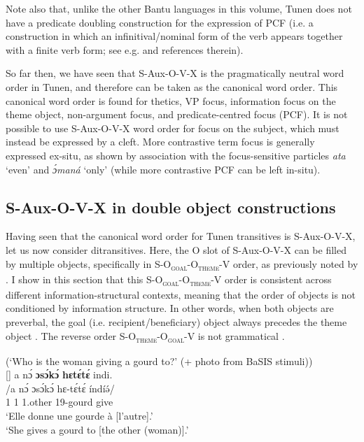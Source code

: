 \documentclass[output=paper,colorlinks,citecolor=brown
]{langscibook}
\begin{document}
\z
\z

Note also that, unlike the other Bantu languages in this volume, Tunen does not have a predicate doubling construction for the expression of PCF (i.e. a construction in which an infinitival/nominal form of the verb appears together with a finite verb form; see e.g. \citealt{GüldemannEtAl2015} and references therein).\largerpage

So far then, we have seen that S-Aux-O-V-X is the pragmatically neutral word order in Tunen, and therefore can be taken as the canonical word order. This canonical word order is found for thetics, VP focus, information focus on the theme object, non-argument focus, and predicate-centred focus (PCF). It is not possible to use S-Aux-O-V-X word order for focus on the subject, which must instead be expressed by a cleft. More contrastive term focus is generally expressed ex-situ, as shown by association with the focus-sensitive particles \textit{ata} `even' and \textit{ɔ́maná} `only' (while more contrastive PCF can be left in-situ).


\subsection{S-Aux-O-V-X in double object constructions}
Having seen that the canonical word order for Tunen transitives is S-Aux-O-V-X, let us now consider ditransitives. Here, the O slot of S-Aux-O-V-X can be filled by multiple objects, specifically in S-O\textsubscript{\textsc{goal}}-O\textsubscript{\textsc{theme}}-V order, as previously noted by \citet{Mous1997, Mous2003}. I show in this section that this S-O\textsubscript{\textsc{goal}}-O\textsubscript{\textsc{theme}}-V order is consistent across different information-structural contexts, meaning that the order of objects is not conditioned by information structure. In other words, when both objects are preverbal, the goal (i.e. recipient/beneficiary) object always precedes the theme object . The reverse order S-O\textsubscript{\textsc{theme}}-O\textsubscript{\textsc{goal}}-V is not grammatical .

\ea  (`Who is the woman giving a gourd to?' (+ photo from BaSIS stimuli)) \\
\ea
[]{
\label{ditrans2}
\glll
{\db}a nɔ́ \textbf{ɔsɔ́kɔ́} \textbf{hɛtɛ́tɛ́} indi.  \\
/a nɔ́ ɔsɔ́kɔ́ hɛ-tɛ́tɛ́ índíə́/ \\
{\db}1\SM{} \PST{}1{} 1.other 19-gourd give \\
\glt
`Elle donne une gourde à [l'autre]\textsubscript{\FOC{}}.' \\ `She gives a gourd to [the other (woman)]\textsubscript{\FOC{}}.' \jambox*{[PM 1541] }
}
\end{document}
